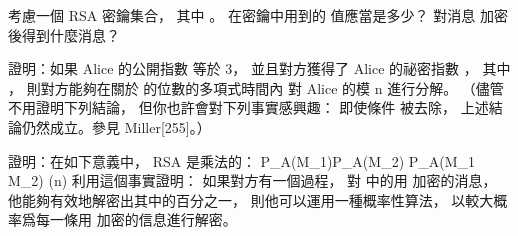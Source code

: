 \startsection[
  title={The RSA public-key cryptosystem},
]

\startEXERCISE
考慮一個 RSA 密鑰集合，
其中 。
在密鑰中用到的  值應當是多少？
對消息  加密後得到什麼消息？
\stopEXERCISE

\startANSWER
{}
\stopANSWER

\startEXERCISE
證明：如果 Alice 的公開指數  等於 3，
並且對方獲得了 Alice 的祕密指數 ，
其中 ，
則對方能夠在關於  的位數的多項式時間內
對 Alice 的模 n 進行分解。
（儘管不用證明下列結論，
但你也許會對下列事實感興趣：
即使條件  被去除，
上述結論仍然成立。參見 Miller[255]。）
\stopEXERCISE

\startANSWER
{}
\stopANSWER

\startEXERCISE
證明：在如下意義中， RSA 是乘法的：
\startformula
P_A(M_1)P_A(M_2) \equiv P_A(M_1 M_2) (\mod n)
\stopformula
利用這個事實證明：
如果對方有一個過程，
對  中的用  加密的消息，
他能夠有效地解密出其中的百分之一，
則他可以運用一種概率性算法，
以較大概率爲每一條用  加密的信息進行解密。
\stopEXERCISE

\startANSWER
{}
\stopANSWER

\stopsection
